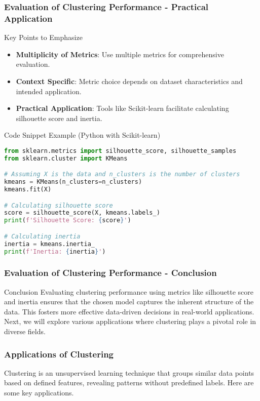 \documentclass[aspectratio=169]{beamer}
\begin{document}
\begin{frame}[fragile]
    \frametitle{Evaluation of Clustering Performance - Practical Application}
    \begin{block}{Key Points to Emphasize}
        \begin{itemize}
            \item \textbf{Multiplicity of Metrics}: Use multiple metrics for comprehensive evaluation.
            \item \textbf{Context Specific}: Metric choice depends on dataset characteristics and intended application.
            \item \textbf{Practical Application}: Tools like Scikit-learn facilitate calculating silhouette score and inertia.
        \end{itemize}
    \end{block}
    
    \begin{block}{Code Snippet Example (Python with Scikit-learn)}
    \begin{lstlisting}[language=Python]
from sklearn.metrics import silhouette_score, silhouette_samples
from sklearn.cluster import KMeans

# Assuming X is the data and n_clusters is the number of clusters
kmeans = KMeans(n_clusters=n_clusters)
kmeans.fit(X)

# Calculating silhouette score
score = silhouette_score(X, kmeans.labels_)
print(f'Silhouette Score: {score}')

# Calculating inertia
inertia = kmeans.inertia_
print(f'Inertia: {inertia}')
    \end{lstlisting}
    \end{block}
\end{frame}

\begin{frame}[fragile]
    \frametitle{Evaluation of Clustering Performance - Conclusion}
    \begin{block}{Conclusion}
        Evaluating clustering performance using metrics like silhouette score and inertia ensures that the chosen model captures the inherent structure of the data. 
        This fosters more effective data-driven decisions in real-world applications. 
        Next, we will explore various applications where clustering plays a pivotal role in diverse fields.
    \end{block}
\end{frame}

\begin{frame}[fragile]
    \frametitle{Applications of Clustering}
    Clustering is an unsupervised learning technique that groups similar data points based on defined features, revealing patterns without predefined labels. Here are some key applications.
\end{frame}
\end{document}
